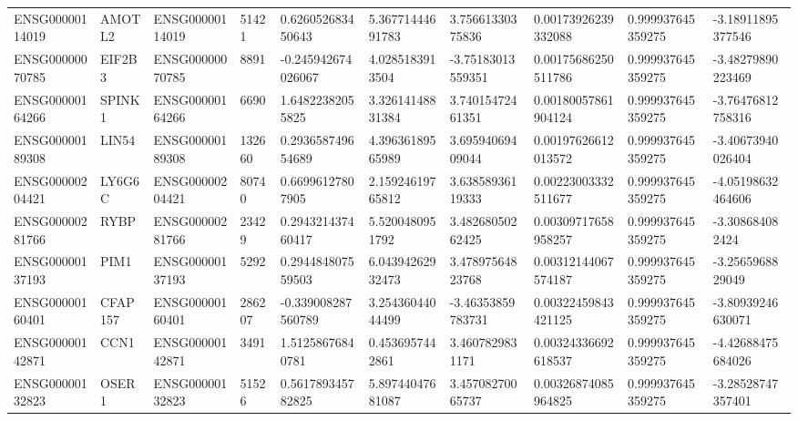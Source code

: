 \begin{tabular}{@{}llllllllll@{}}
ENSG00000114019 & AMOTL2 & ENSG00000114019 & 51421 & 0.626052683450643 & 5.36771444691783 & 3.75661330375836 & 0.00173926239332088 & 0.999937645359275 & -3.18911895377546 \\
ENSG00000070785 & EIF2B3 & ENSG00000070785 & 8891 & -0.245942674026067 & 4.0285183913504 & -3.75183013559351 & 0.00175686250511786 & 0.999937645359275 & -3.48279890223469 \\
ENSG00000164266 & SPINK1 & ENSG00000164266 & 6690 & 1.64822382055825 & 3.32614148831384 & 3.74015472461351 & 0.00180057861904124 & 0.999937645359275 & -3.76476812758316 \\
ENSG00000189308 & LIN54 & ENSG00000189308 & 132660 & 0.293658749654689 & 4.39636189565989 & 3.69594069409044 & 0.00197626612013572 & 0.999937645359275 & -3.40673940026404 \\
ENSG00000204421 & LY6G6C & ENSG00000204421 & 80740 & 0.66996127807905 & 2.15924619765812 & 3.63858936119333 & 0.00223003332511677 & 0.999937645359275 & -4.05198632464606 \\
ENSG00000281766 & RYBP & ENSG00000281766 & 23429 & 0.294321437460417 & 5.5200480951792 & 3.48268050262425 & 0.00309717658958257 & 0.999937645359275 & -3.308684082424 \\
ENSG00000137193 & PIM1 & ENSG00000137193 & 5292 & 0.294484807559503 & 6.04394262932473 & 3.47897564823768 & 0.00312144067574187 & 0.999937645359275 & -3.2565968829049 \\
ENSG00000160401 & CFAP157 & ENSG00000160401 & 286207 & -0.339008287560789 & 3.25436044044499 & -3.46353859783731 & 0.00322459843421125 & 0.999937645359275 & -3.80939246630071 \\
ENSG00000142871 & CCN1 & ENSG00000142871 & 3491 & 1.51258676840781 & 0.4536957442861 & 3.4607829831171 & 0.00324336692618537 & 0.999937645359275 & -4.42688475684026 \\
ENSG00000132823 & OSER1 & ENSG00000132823 & 51526 & 0.561789345782825 & 5.89744047681087 & 3.45708270065737 & 0.00326874085964825 & 0.999937645359275 & -3.28528747357401 \\
\bottomrule
\end{tabular}
\endgroup
